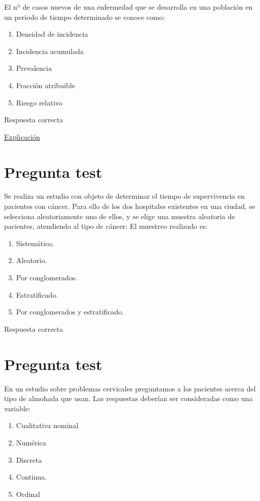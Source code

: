 \documentclass[
]{book}
\providecommand{\tightlist}{%
  \setlength{\itemsep}{0pt}\setlength{\parskip}{0pt}}
\begin{document}
El nº de casos nuevos de una enfermedad que se desarrolla en una población en un periodo de tiempo determinado se conoce como:

\begin{enumerate}
\def\labelenumi{\alph{enumi})}
\tightlist
\item
  Densidad de incidencia
\item
  Incidencia acumulada
\item
  Prevalencia
\item
  Fracción atribuible
\item
  Riesgo relativo
\end{enumerate}

Respuesta correcta

\href{https://www.conprueba.es/glosario/incidencia-acumulada}{Explicación}

\hypertarget{pregunta-test-10}{%
\section{Pregunta test}\label{pregunta-test-10}}

Se realiza un estudio con objeto de determinar el tiempo de supervivencia en pacientes con cáncer. Para ello de los dos hospitales existentes en una ciudad, se selecciona aleatoriamente uno de ellos, y se elige una muestra aleatoria de pacientes, atendiendo al tipo de cáncer: El muestreo realizado es:

\begin{enumerate}
\def\labelenumi{\alph{enumi})}
\tightlist
\item
  Sistemático.
\item
  Aleatorio.
\item
  Por conglomerados.
\item
  Estratificado.
\item
  Por conglomerados y estratificado.
\end{enumerate}

Respuesta correcta

\hypertarget{pregunta-test-11}{%
\section{Pregunta test}\label{pregunta-test-11}}

En un estudio sobre problemas cervicales preguntamos a los pacientes acerca del tipo de almohada que usan. Las respuestas deberían ser consideradas como una variable:

\begin{enumerate}
\def\labelenumi{\alph{enumi})}
\tightlist
\item
  Cualitativa nominal
\item
  Numérica
\item
  Discreta
\item
  Continua.
\item
  Ordinal
\end{enumerate}
\end{document}

